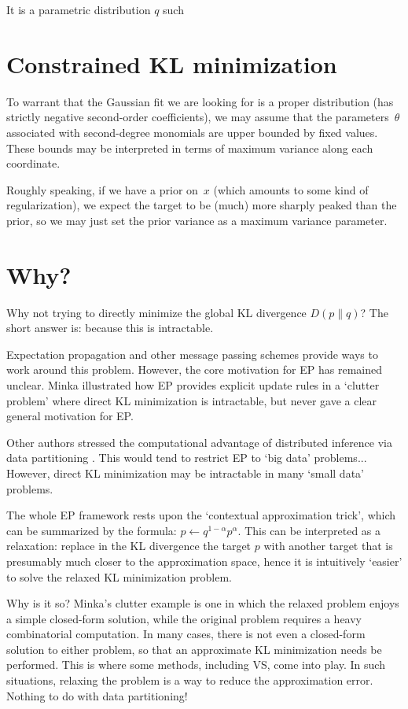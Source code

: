 \documentclass{article}
\begin{document}
It is a parametric distribution $q$ such 


\section{Constrained KL minimization}

To warrant that the Gaussian fit we are looking for is a proper distribution (has strictly negative second-order coefficients), we may assume that the parameters~$\theta$ associated with second-degree monomials are upper bounded by fixed values. These bounds may be interpreted in terms of maximum variance along each coordinate.

Roughly speaking, if we have a prior on~$x$ (which amounts to some kind of regularization), we expect the target to be (much) more sharply peaked than the prior, so we may just set the prior variance as a maximum variance parameter. 


\section{Why?}

Why not trying to directly minimize the global KL divergence $D(p\|q)$? The short answer is: because this is intractable.

Expectation propagation and other message passing schemes \cite{Minka-01,Minka-05} provide ways to work around this problem. However, the core motivation for EP has remained unclear. Minka illustrated how EP provides explicit update rules in a `clutter problem' where direct KL minimization is intractable, but never gave a clear general motivation for EP.

Other authors stressed the computational advantage of distributed inference via data partitioning \cite{Vehtari-14}. This would tend to restrict EP to `big data' problems... However, direct KL minimization may be intractable in many `small data' problems. 

The whole EP framework rests upon the `contextual approximation trick', which can be summarized by the formula: $p\leftarrow q^{1-\alpha}p^\alpha$. This can be interpreted as a relaxation: replace in the KL divergence the target $p$ with another target that is presumably much closer to the approximation space, hence it is intuitively `easier' to solve the relaxed KL minimization problem.

Why is it so? Minka's clutter example is one in which the relaxed problem enjoys a simple closed-form solution, while the original problem requires a heavy combinatorial computation. In many cases, there is not even a closed-form solution to either problem, so that an approximate KL minimization needs be performed. This is where some methods, including VS, come into play. In such situations, relaxing the problem is a way to reduce the approximation error. Nothing to do with data partitioning!
\end{document}
